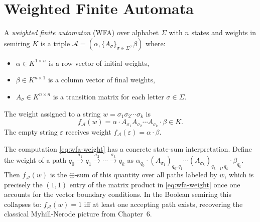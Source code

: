 \section{Weighted Finite Automata}

\begin{definition}
A \emph{weighted finite automaton} (WFA) over alphabet $\Sigma$ with $n$ states and weights in semiring $K$ is a triple $\mathcal{A} = (\alpha, \{A_\sigma\}_{\sigma \in \Sigma}, \beta)$ where:
\begin{itemize}
  \item $\alpha \in K^{1 \times n}$ is a row vector of initial weights,
  \item $\beta \in K^{n \times 1}$ is a column vector of final weights,
  \item $A_\sigma \in K^{n \times n}$ is a transition matrix for each letter $\sigma \in \Sigma$.
\end{itemize}
The weight assigned to a string $w = \sigma_1 \sigma_2 \cdots \sigma_k$ is
\begin{equation}\label{eq:wfa-weight}
  f_\mathcal{A}(w) = \alpha \cdot A_{\sigma_1} A_{\sigma_2} \cdots A_{\sigma_k} \cdot \beta \in K.
\end{equation}
The empty string $\varepsilon$ receives weight $f_\mathcal{A}(\varepsilon) = \alpha \cdot \beta$.
\end{definition}

The computation \eqref{eq:wfa-weight} has a concrete state-sum interpretation. Define the weight of a path $q_0 \xrightarrow{\sigma_1} q_1 \xrightarrow{\sigma_2} \cdots \xrightarrow{\sigma_k} q_k$ as $\alpha_{q_0} \cdot (A_{\sigma_1})_{q_0, q_1} \cdots (A_{\sigma_k})_{q_{k-1}, q_k} \cdot \beta_{q_k}$. Then $f_\mathcal{A}(w)$ is the $\oplus$-sum of this quantity over all paths labeled by $w$, which is precisely the $(1,1)$ entry of the matrix product in \eqref{eq:wfa-weight} once one accounts for the vector boundary conditions. In the Boolean semiring this collapses to: $f_\mathcal{A}(w) = 1$ iff at least one accepting path exists, recovering the classical Myhill-Nerode picture from Chapter~6.

